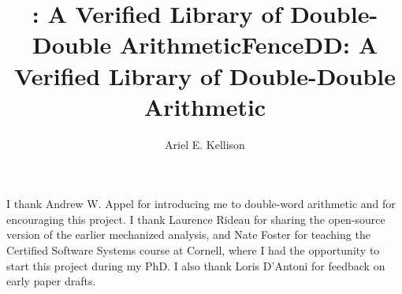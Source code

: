 \documentclass[sigplan,screen]{acmart}
\title{\FenceDD: A Verified Library of Double-Double Arithmetic}
\theoremstyle{plain}
\theoremstyle{definition}
\theoremstyle{remark}
\begin{document}
\title{FenceDD: A Verified Library of Double-Double Arithmetic}

\author{Ariel E. Kellison}
\correspondingauthor
{}

\maketitle










\begin{acks}
I thank Andrew W. Appel for introducing me to double-word
arithmetic and for encouraging this project. I thank Laurence
Rideau for sharing the open-source version of the earlier
mechanized analysis, and Nate Foster for teaching the Certified
Software Systems course at Cornell, where I had the opportunity 
to start this project during my PhD.
I also thank Loris D'Antoni for feedback on early paper drafts.
\end{acks}

\begingroup
{}

\endgroup
%
\end{document}
